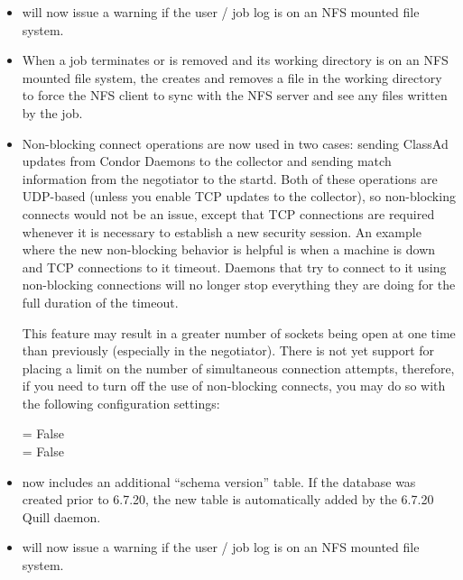 \begin{itemize}
\item {} will now issue a warning if the user / job log
is on an NFS mounted file system.

\item When a job terminates or is removed and its working directory is
on an NFS mounted file system, the  creates and removes a
file in the working directory to force the NFS client to sync with the
NFS server and see any files written by the job.

\item Non-blocking connect operations are now used in two cases:
sending ClassAd updates from Condor Daemons to the collector and
sending match information from the negotiator to the startd.  Both of
these operations are UDP-based (unless you enable TCP updates to the
collector), so non-blocking connects would not be an issue, except
that TCP connections are required whenever it is necessary to
establish a new security session.  An example where the new non-blocking
behavior is helpful is when a machine is down and TCP connections to it
timeout.  Daemons that try to connect to it using non-blocking connections
will no longer stop everything they are doing for the full duration of the
timeout.

This feature may result in a greater number of sockets being open at
one time than previously (especially in the negotiator).  There is not
yet support for placing a limit on the number of simultaneous
connection attempts, therefore, if you need to turn off the use of
non-blocking connects, you may do so with the following
configuration settings:

 = False \\
 = False

\item {} now includes an additional ``schema version'' table.
If the database was created prior to 6.7.20, the new table is automatically
added by the 6.7.20 Quill daemon.

%

\item {} will now issue a warning if the user / job log
is on an NFS mounted file system.

\end{itemize}

